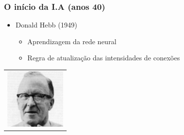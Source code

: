 \documentclass[aspectratio=169]{beamer}
\begin{document}
	\begin{frame}
		\frametitle{O início da I.A (anos 40)}
		\begin{itemize}
			\item Donald Hebb (1949)
			\begin{itemize}
				\item Aprendizagem da rede neural
				\item Regra de atualização das intensidades de conexões 
			\end{itemize}
		\end{itemize}
		
		\begin{table}
			\centering
			\begin{tabular}{c}				
				\includegraphics[height=3cm, keepaspectratio]{../figs/cap01/hebb.jpg} 
				
			\end{tabular}
		\end{table}
	\end{frame}	
\end{document}
